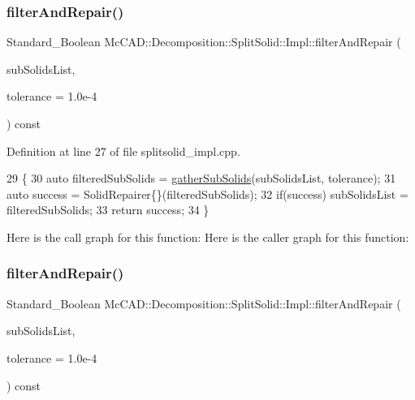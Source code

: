\subsubsection{\texorpdfstring{filter\+And\+Repair()}{filterAndRepair()}\hspace{0.1cm}{\footnotesize\ttfamily [1/2]}}
{\footnotesize\ttfamily Standard\+\_\+\+Boolean Mc\+C\+A\+D\+::\+Decomposition\+::\+Split\+Solid\+::\+Impl\+::filter\+And\+Repair (\begin{DoxyParamCaption}\item[{Top\+Tools\+\_\+\+H\+Sequence\+Of\+Shape \&}]{sub\+Solids\+List,  }\item[{Standard\+\_\+\+Real}]{tolerance = {\ttfamily 1.0e-\/4} }\end{DoxyParamCaption}) const\hspace{0.3cm}{\ttfamily [private]}}



Definition at line 27 of file splitsolid\+\_\+impl.\+cpp.


\begin{DoxyCode}
29                                       \{
30     \textcolor{keyword}{auto} filteredSubSolids = \hyperlink{classMcCAD_1_1Decomposition_1_1SplitSolid_1_1Impl_a18b18ada23d0b1c722679d7c30f1b391}{gatherSubSolids}(subSolidsList, tolerance);
31     \textcolor{keyword}{auto} success = SolidRepairer\{\}(filteredSubSolids);
32     \textcolor{keywordflow}{if}(success) subSolidsList = filteredSubSolids;
33     \textcolor{keywordflow}{return} success;
34 \}
\end{DoxyCode}
Here is the call graph for this function\+:
Here is the caller graph for this function\+:
\mbox{\label{classMcCAD_1_1Decomposition_1_1SplitSolid_1_1Impl_ab12750fdedddaba9cbb2c953e82755da}} 
\subsubsection{\texorpdfstring{filter\+And\+Repair()}{filterAndRepair()}\hspace{0.1cm}{\footnotesize\ttfamily [2/2]}}
{\footnotesize\ttfamily Standard\+\_\+\+Boolean Mc\+C\+A\+D\+::\+Decomposition\+::\+Split\+Solid\+::\+Impl\+::filter\+And\+Repair (\begin{DoxyParamCaption}\item[{Top\+Tools\+\_\+\+H\+Sequence\+Of\+Shape \&}]{sub\+Solids\+List,  }\item[{Standard\+\_\+\+Real}]{tolerance = {\ttfamily 1.0e-\/4} }\end{DoxyParamCaption}) const\hspace{0.3cm}{\ttfamily [private]}}

